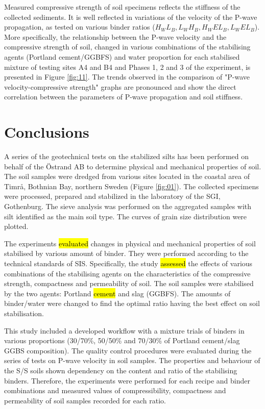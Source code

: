 \documentclass{amestyle}
\begin{document}
Measured compressive strength of soil specimens reflects the stiffness of the collected sediments. It is well reflected in variations of the velocity of the P-wave propagation, as tested on various binder ratios ($H_WL_B, L_WH_B, H_WEL_B, L_WEL_B$). More specifically, the relationship between the P-wave velocity and the compressive strength of soil, changed in various combinations of the stabilising agents (Portland cement/GGBFS) and water proportion for each stabilised mixture of testing sites A4 and B4 and Phases 1, 2 and 3 of the experiment, is presented in Figure \ref{fig:11}. The trends observed in the comparison of "P-wave velocity-compressive strength" graphs are pronounced and show the direct correlation between the parameters of P-wave propagation and soil stiffness. 

\section{Conclusions}
\label{sec:conclusions}

A series of the geotechnical tests on the stabilized silts has been performed on behalf of the Östrand AB to determine physical and mechanical properties of soil. The soil samples were dredged from various sites located in the coastal area of Timrå, Bothnian Bay, northern Sweden (Figure \ref{fig:01}). The collected specimens were processed, prepared and stabilized in the laboratory of the SGI, Gothenburg. The sieve analysis was performed on the aggregated samples with silt identified as the main soil type. The curves of grain size distribution were plotted. 

The experiments \hl{evaluated} changes in physical and mechanical properties of soil stabilised by various amount of binder. They were performed according to the technical standards of SIS. Specifically, the study \hl{assessed} the effects of various combinations of the stabilising agents on the characteristics of the compressive strength, compactness and permeability of soil. The soil samples were stabilised by the two agents: Portland \hl{cement} and slag (GGBFS). The amounts of binder/water were changed to find the optimal ratio having the best effect on soil stabilisation. 

This study included a developed workflow with a mixture trials of binders in various proportions (30/70\%, 50/50\% and 70/30\% of Portland cement/slag GGBS composition). The quality control procedures were evaluated during the series of  tests on P-wave velocity in soil samples. The properties and behaviour of the S/S soils shown dependency on the content and ratio of the stabilising binders. Therefore, the experiments were performed for each recipe and binder combinations and measured values of compressibility, compactness and permeability of soil samples recorded for each ratio. 
\end{document}

